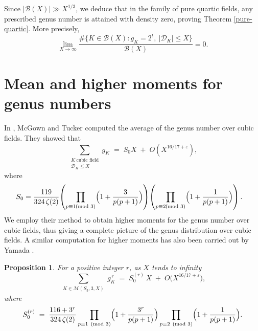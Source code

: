 \documentclass[11pt,reqno]{amsart}
\newcommand{\cB}{\mathcal{B}}
\newcommand{\cM}{\mathcal{M}}
\newtheorem{proposition}[theorem]{Proposition}
\theoremstyle{definition}
\theoremstyle{remark}
\begin{document}
\medskip
Since $|\cB(X)|\gg X^{1/3}$, we deduce that in the family of pure quartic fields, any prescribed genus number is attained with density zero, proving Theorem \ref{pure-quartic}. More precisely, 
\[
   \lim_{X\to\infty} \frac{\#\{K \in \mathcal{B}(X): g_K = 2^{t},\ |\mathcal{D}_K|\le X\}}
         {\mathcal{B}(X)}
    = 0.
\]

\medskip
\section{\bf Mean and higher moments for genus numbers}\label{higher-moments}
\medskip

In \cite[Theorem 2]{cubicwithgenusnumber1}, McGown and Tucker computed the average of the genus number over cubic fields. They showed that
\begin{equation}\label{tucker-mean}
    \sum_{\substack{K\ \text{cubic field} \\ \mathcal{D}_K \le X}} g_K
\;=\;
S_0
X \;+\;
O\!\left(X^{16/17+\varepsilon}\right),
\end{equation}
where \begin{align*}
  S_0= \frac{119}{324\,\zeta(2)}
\!\left(\prod_{p\equiv 1 \!\!\!\pmod 3}
      \Bigl(1+\frac{3}{p(p+1)}\Bigr)\right) &
\!\left(\prod_{p\equiv 2 \!\!\!\pmod 3}
      \Bigl(1+\frac{1}{p(p+1)}\Bigr)\right).
\end{align*}
We employ their method to obtain higher moments for the genus number over cubic fields, thus giving a complete picture of the genus distribution over cubic fields. A similar computation for higher moments has also been carried out by Yamada \cite{Yam26}.
\begin{proposition}\label{prop:highermoments:S3}
For a positive integer $r$, as $X$ tends to infinity
\[
\sum_{\substack{K\in \cM(S_3, 3, X)}} g_K^{\,r}
\;=\;
S_0^{(r)}\,X \;+\; O\!\bigl(X^{16/17+\varepsilon}\bigr),
\]
where
\[
S_0^{(r)} \;=\; \frac{116+3^{r}}{324\,\zeta(2)}
\prod_{p\equiv1\pmod3}\Bigl(1+\frac{3^{r}}{p(p+1)}\Bigr)
\prod_{p\equiv2\pmod3}\Bigl(1+\frac{1}{p(p+1)}\Bigr).
\]
\end{proposition}
\end{document}

